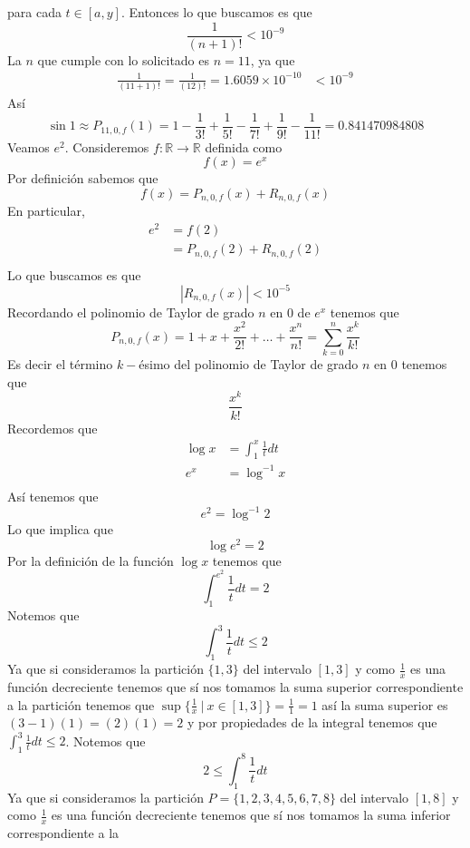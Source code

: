 \documentclass[a4paper]{article}
\begin{document}
para cada \(t \in [a, y]\).
\newline 
Entonces lo que buscamos es que 
\[
    \frac{1}{(n + 1)!} < 10^{-9}
\]
La \(n\) que cumple con lo solicitado es \(n = 11\), ya que 
\begin{align*}
    \frac{1}{(11 + 1)!} = \frac{1}{(12)!} = 1{.}6059 \times 10^{-10} & < 10^{-9}
\end{align*}
Así 
\[
    \sin{1} \approx P_{11, 0, f}(1) = 1 - \frac{1}{3!} + \frac{1}{5!} - \frac{1}{7!} + \frac{1}{9!} - \frac{1}{11!}
    = 0{.}841470984808
\]
Veamos \(e^{2}\).
\newline 
Consideremos \(f : \mathbb{R} \to \mathbb{R}\) definida como
\[
    f(x) = e^{x}
\]
Por definición sabemos que 
\[
    f(x) = P_{n, 0, f}(x) + R_{n, 0, f}(x)
\]
En particular, 
\begin{align*}
    e^{2} &= f(2) \\
    &= P_{n, 0, f}(2) + R_{n, 0, f}(2) \\
\end{align*}
Lo que buscamos es que 
\[
    | R_{n, 0, f}(x) | < 10^{-5}
\]
Recordando el polinomio de Taylor de grado \(n\) en \(0\) de \(e^{x}\) tenemos que
\[
    P_{n, 0, f}(x) = 1 + x + \frac{x^2}{2!} + \dotsc + \frac{x^n}{n!} = \sum_{k = 0}^{n} \frac{x^k}{k!}
\]
Es decir el término \(k-\)ésimo del polinomio de Taylor de grado \(n\) en \(0\) tenemos que
\[
    \frac{x^k}{k!}
\]
Recordemos que 
\begin{align*}
    \log{x} &= \int_{1}^{x} \frac{1}{t} dt \\
    e^{x} &= \log^{-1}{x} \\
\end{align*}
Así tenemos que
\[
    e^{2} = \log^{-1}{2}
\]
Lo que implica que
\[
    \log{e^{2}} = 2
\]
Por la definición de la función \(\log{x}\) tenemos que 
\[
    \int_{1}^{e^{2}} \frac{1}{t} dt = 2
\]
Notemos que
\[
    \int_{1}^{3} \frac{1}{t} dt  \leq 2
\]
Ya que si consideramos la partición \(\{1, 3\}\) del intervalo \([1, 3]\) y como \(\frac{1}{x}\)
es una función decreciente tenemos que sí nos tomamos la suma superior correspondiente a la 
partición tenemos que \(\sup \{\frac{1}{x} \ | \ x \in [1, 3]\} = \frac{1}{1} = 1 \) así la suma superior 
es \((3 - 1)(1) = (2)(1) = 2\) y por propiedades de la integral tenemos que \(\int_{1}^{3} \frac{1}{t} dt  \leq 2\).
Notemos que 
\[
    2 \leq \int_{1}^{8} \frac{1}{t} dt  
\]
Ya que si consideramos la partición \(P = \{1, 2, 3, 4, 5, 6, 7, 8\}\) del intervalo \([1, 8]\) y como \(\frac{1}{x}\)
es una función decreciente tenemos que sí nos tomamos la suma inferior correspondiente a la 
\end{document}
